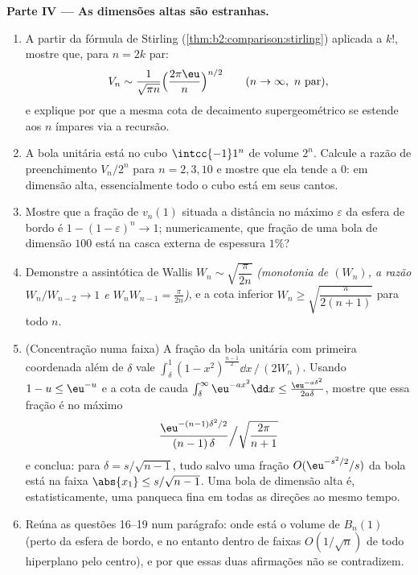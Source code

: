 \begin{problem}[{Problema de fim de semana --- $V_n =
\pi^{n/2}/\Gamma(\frac n2 + 1)$, e a estranheza das
dimensões altas}]
\medskip
\noindent\textbf{Parte IV --- As dimensões altas são estranhas.}
\begin{enumerate}[resume]
  \item A partir da fórmula de Stirling
        (\cref{thm:b2:comparison:stirling}) aplicada a $k!$,
        mostre que, para $n = 2k$ par:
        \[
        V_n \sim \frac{1}{\sqrt{\pi n}}
        \Bigl(\frac{2\pi\eu}{n}\Bigr)^{n/2}
        \qquad (n \to \infty, \ n \text{ par}),
        \]
        e explique por que a mesma cota de decaimento supergeométrico
        se estende aos $n$ ímpares via a recursão.
  \item A bola unitária está no cubo $\intcc{-1}1^n$ de
        volume $2^n$. Calcule a razão de preenchimento $V_n/2^n$ para
        $n = 2, 3, 10$ e mostre que ela tende a $0$: em dimensão
        alta, essencialmente todo o cubo está em seus
        cantos.
  \item Mostre que a fração de $v_n(1)$ situada a
        distância no máximo $\varepsilon$ da esfera de bordo é $1 -
        (1 - \varepsilon)^n \to 1$; numericamente, que
        fração de uma bola de dimensão $100$ está na
        casca externa de espessura $1\%$?
  \item Demonstre a assintótica de Wallis $W_n \sim
        \sqrt{\dfrac{\pi}{2n}}$ \emph{(monotonia de
        $(W_n)$, a razão $W_n/W_{n-2} \to 1$ e $W_nW_{n-1}
        = \frac\pi{2n}$)}, e a cota inferior $W_n \geq
        \sqrt{\dfrac{\pi}{2(n+1)}}$ para todo $n$.
  \item (Concentração numa faixa) A fração da bola unitária
        com primeira coordenada além de $\delta$ vale
        $\int_\delta^1(1 - x^2)^{\frac{n-1}2}\dd x \,\big/\,
        (2W_n)$. Usando $1 - u \leq \eu^{-u}$ e a cota
        de cauda $\int_\delta^\infty \eu^{-a x^2}\dd x \leq
        \frac{\eu^{-a\delta^2}}{2a\delta}$, mostre que essa
        fração é no máximo
        \[
        \frac{\eu^{-(n-1)\delta^2/2}}{(n-1)\,\delta}
        \Big/ \sqrt{\frac{2\pi}{n+1}}
        \]
        e conclua: para $\delta = s/\sqrt{n-1}$, tudo salvo uma
        fração $O(\eu^{-s^2/2}/s)$ da bola está na
        faixa $\abs{x_1} \leq s/\sqrt{n-1}$. Uma bola de dimensão
        alta é, estatisticamente, uma panqueca fina em todas
        as direções ao mesmo tempo.
  \item Reúna as questões 16--19 num parágrafo: onde
        está o volume de $B_n(1)$ (perto da esfera de bordo,
        e no entanto dentro de faixas $O(1/\sqrt n)$ de todo
        hiperplano pelo centro), e por que essas duas
        afirmações não se contradizem.
\end{enumerate}


\end{problem}
